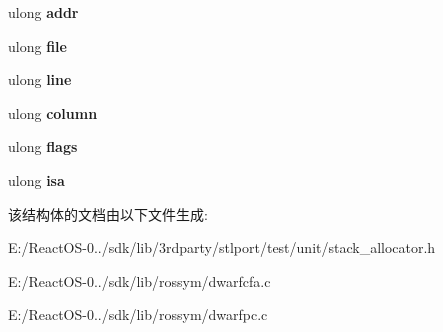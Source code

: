 \begin{DoxyCompactItemize}
\item 
\mbox{\label{struct_state_a7d5332995904181903d157988b361d11}} 
ulong {\bfseries addr}
\item 
\mbox{\label{struct_state_a32b34e6375d85586b5a8bb5ac848f8f1}} 
ulong {\bfseries file}
\item 
\mbox{\label{struct_state_a25de991b5fee604696e202dc6f606f8c}} 
ulong {\bfseries line}
\item 
\mbox{\label{struct_state_a69905f8acb7b3917c7269694eb99106e}} 
ulong {\bfseries column}
\item 
\mbox{\label{struct_state_acb301e8b2f58e7f80cb0fe20c5c9dbe8}} 
ulong {\bfseries flags}
\item 
\mbox{\label{struct_state_ae17f81831ca1409a434fd4666b052f54}} 
ulong {\bfseries isa}
\end{DoxyCompactItemize}


该结构体的文档由以下文件生成\+:\begin{DoxyCompactItemize}
\item 
E\+:/\+React\+O\+S-\/0../sdk/lib/3rdparty/stlport/test/unit/stack\+\_\+allocator.\+h\item 
E\+:/\+React\+O\+S-\/0../sdk/lib/rossym/dwarfcfa.\+c\item 
E\+:/\+React\+O\+S-\/0../sdk/lib/rossym/dwarfpc.\+c\end{DoxyCompactItemize}
